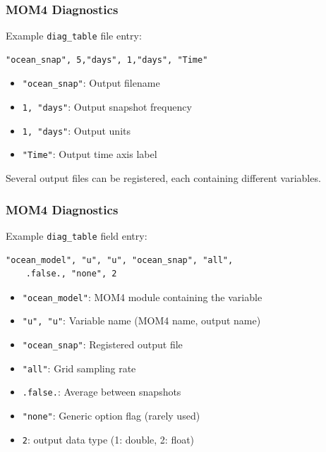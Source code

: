 \documentclass[red]{beamer}
\begin{document}
\begin{frame}[fragile]
    \frametitle{MOM4 Diagnostics}
    
    Example \lstinline|diag_table| file entry:
    \begin{lstlisting}
"ocean_snap", 5,"days", 1,"days", "Time"
    \end{lstlisting}
    \begin{itemize}
        \item \lstinline|"ocean_snap"|: Output filename
        \item \lstinline|1, "days"|: Output snapshot frequency
        \item \lstinline|1, "days"|: Output units
        \item \lstinline|"Time"|: Output time axis label
    \end{itemize}
    Several output files can be registered, each containing different
    variables.
\end{frame}

\begin{frame}[fragile]
    \frametitle{MOM4 Diagnostics}
    
    Example \lstinline|diag_table| field entry:
    \begin{lstlisting}
"ocean_model", "u", "u", "ocean_snap", "all",
    .false., "none", 2
    \end{lstlisting}
    \begin{itemize}
        \item \lstinline|"ocean_model"|: MOM4 module containing the variable
        \item \lstinline|"u", "u"|: Variable name (MOM4 name, output name)
        \item \lstinline|"ocean_snap"|: Registered output file
        \item \lstinline|"all"|: Grid sampling rate
        \item \lstinline|.false.|: Average between snapshots
        \item \lstinline|"none"|: Generic option flag (rarely used)
        \item \lstinline|2|: output data type (1: double, 2: float)
    \end{itemize}
\end{frame}
\end{document}
